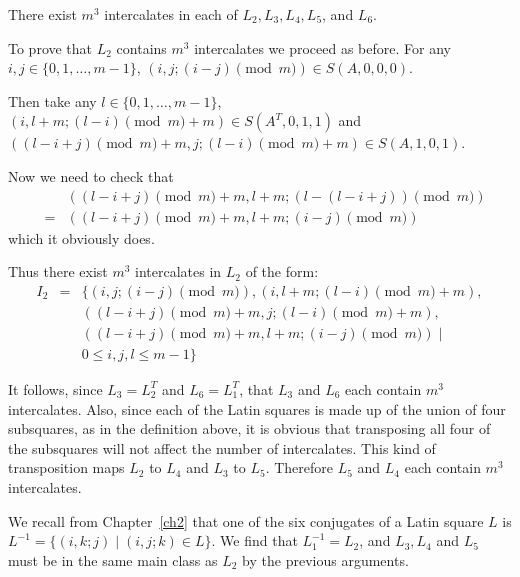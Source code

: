 \documentclass[12pt]{report}
\begin{document}
There exist $m^3$ intercalates in each of $L_2, L_3, L_4, L_5$, and $L_6$.

To prove that $L_2$ contains $m^3$ intercalates we proceed as before.
For any $i,j \in \{ 0,1, \dots, m-1 \}$, $(i, j; (i-j) \pmod{m} ) \in S(A,0,0,0)$.

Then take any $l \in \{0,1, \dots, m-1 \}$, $(i, l+m; (l-i) \pmod{m} + m ) \in S(A^T,0,1,1)$ and
$((l-i+j) \pmod{m} + m, j; (l-i) \pmod{m}+m) \in S(A,1,0,1)$.

Now we need to check that
\begin{eqnarray*}
&&( (l-i+j) \pmod{m} + m, l+m; (l-(l-i+j)) \pmod{m} ) \\
&=& ((l-i+j) \pmod{m} + m, l+m; (i-j) \pmod{m}) 
\end{eqnarray*}
which it obviously does.

Thus there exist $m^3$ intercalates in $L_2$ of the form:
\begin{eqnarray*}
I_2 &=& \{(i,j;(i-j) \pmod{m}),(i,l+m;(l-i) \pmod{m}+m),\\
&&((l-i+j) \pmod{m}+m,j;(l-i) \pmod{m}+m), \\
&& ((l-i+j) \pmod{m}+m,l+m;(i-j) \pmod{m}) \mid \\
&& 0 \leq i,j,l \leq m-1 \}
\end{eqnarray*}


It follows, since $L_3 = L_2^T$ and $L_6 = L_1^T$, that $L_3$ and $L_6$
each contain $m^3$ intercalates.  Also, since each of the Latin squares
is made up of the union of four subsquares, as in the definition
above, it is obvious that transposing all four of the subsquares will
not affect the number of intercalates.  This kind of transposition
maps $L_2$ to $L_4$ and $L_3$ to $L_5$.  Therefore $L_5$ and $L_4$
each contain $m^3$ intercalates.

We recall from Chapter~\ref{ch2} that one of the six conjugates of a Latin square 
$L$ is $L^{-1} = \{ (i, k; j) \mid (i, j; k) \in L \}$.
We find that $L_1^{-1} = L_2$, and $L_3, L_4$ and $L_5$ must be in the
same main class as $L_2$ by the previous arguments.
\end{document}
